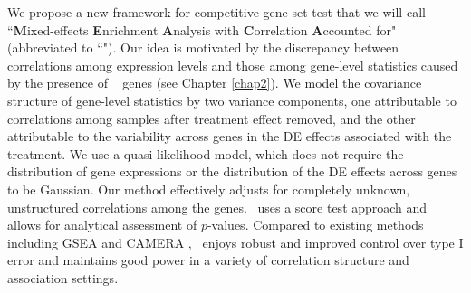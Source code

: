 %	
	
	
	
	We propose a new framework for competitive gene-set test that we will call 
	``\textbf{M}ixed-effects \textbf{E}nrichment \textbf{A}nalysis with \textbf{C}orrelation 
	\textbf{A}ccounted for" 
	(abbreviated to ``\OurMethod"). Our idea is motivated by the discrepancy between correlations
	among expression levels and those among gene-level statistics caused by the presence of \DED~ 
	genes (see Chapter \ref{chap2}). 
	We model the covariance structure of gene-level statistics by two 
	variance components, one attributable to correlations among samples after treatment effect 
	removed, and the other attributable to the variability across genes in the DE effects 
	associated with the treatment. 
	We use a quasi-likelihood model, which does not require the distribution of gene expressions or 
	the distribution of the DE effects across genes to be Gaussian. Our method effectively 
	adjusts for completely unknown,	unstructured correlations among the genes. \OurMethod~uses a 
	score test approach and allows for analytical assessment of $p$-values. Compared to existing 
	methods including GSEA \citep{subramanian2005gene} and CAMERA \citep{wu2012camera}, 
	\OurMethod~enjoys robust and improved control over type I 
	error and maintains good power in a	variety of correlation structure and association settings. 
	
